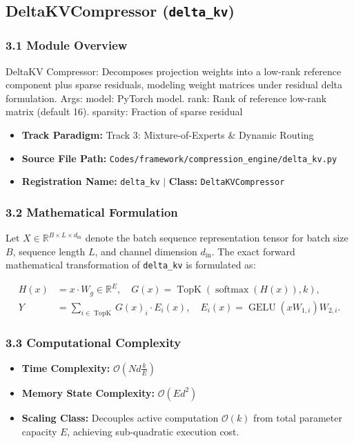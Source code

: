 \subsection{DeltaKVCompressor (\texttt{delta\_kv})}
\label{sec:app_module_delta_kv}

\subsubsection*{3.1 Module Overview}
DeltaKV Compressor: Decomposes projection weights into a low-rank reference component plus sparse residuals, modeling weight matrices under residual delta formulation.  Args:     model: PyTorch model.     rank: Rank of reference low-rank matrix (default 16).     sparsity: Fraction of sparse residual
\begin{itemize}
    \item \textbf{Track Paradigm:} Track 3: Mixture-of-Experts & Dynamic Routing
    \item \textbf{Source File Path:} \texttt{Codes/framework/compression\_engine/delta\_kv.py}
    \item \textbf{Registration Name:} \texttt{delta\_kv} $\mid$ \textbf{Class:} \texttt{DeltaKVCompressor}
\end{itemize}

\subsubsection*{3.2 Mathematical Formulation}
Let $X \in \mathbb{R}^{B \times L \times d_{\text{in}}}$ denote the batch sequence representation tensor for batch size $B$, sequence length $L$, and channel dimension $d_{\text{in}}$. The exact forward mathematical transformation of \texttt{delta\_kv} is formulated as:

\begin{align}
H(x) &= x \cdot W_g \in \mathbb{R}^{E}, \quad G(x) = \operatorname{TopK}\left(\operatorname{softmax}(H(x)), k\right), \\
Y &= \sum_{i \in \operatorname{TopK}} G(x)_i \cdot E_i(x), \quad E_i(x) = \operatorname{GELU}(x W_{1, i}) W_{2, i}.
\end{align}


\subsubsection*{3.3 Computational Complexity}
\begin{itemize}
    \item \textbf{Time Complexity:} $\mathcal{O}(N d \frac{k}{E})$
    \item \textbf{Memory State Complexity:} $\mathcal{O}(E d^2)$
    \item \textbf{Scaling Class:} Decouples active computation $\mathcal{O}(k)$ from total parameter capacity $E$, achieving sub-quadratic execution cost.
\end{itemize}

